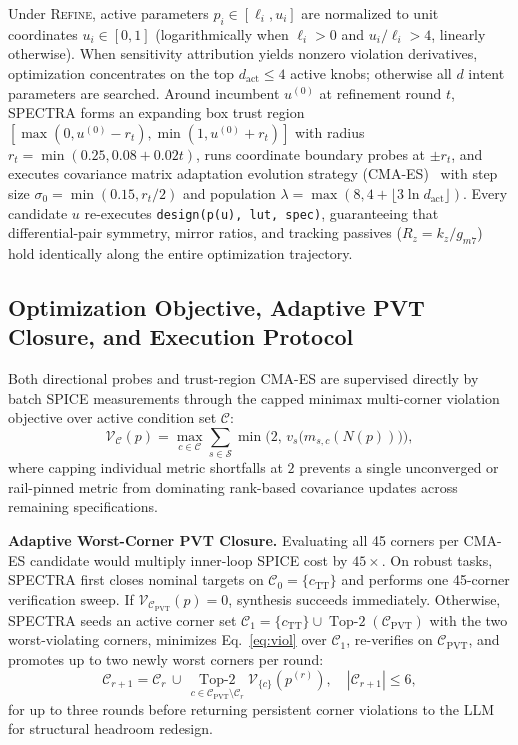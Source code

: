 Under \textsc{Refine}, active parameters $p_i \in [\ell_i, u_i]$ are normalized to unit coordinates $u_i \in [0, 1]$ (logarithmically when $\ell_i > 0$ and $u_i / \ell_i > 4$, linearly otherwise). When sensitivity attribution yields nonzero violation derivatives, optimization concentrates on the top $d_{\text{act}} \le 4$ active knobs; otherwise all $d$ intent parameters are searched. Around incumbent $u^{(0)}$ at refinement round $t$, \textsc{SPECTRA} forms an expanding box trust region $[\max(0, u^{(0)} - r_t), \min(1, u^{(0)} + r_t)]$ with radius $r_t = \min(0.25, 0.08 + 0.02 t)$, runs coordinate boundary probes at $\pm r_t$, and executes covariance matrix adaptation evolution strategy (CMA-ES)~\cite{hansen2016cma} with step size $\sigma_0 = \min(0.15, r_t/2)$ and population $\lambda = \max(8, 4 + \lfloor 3 \ln d_{\text{act}} \rfloor)$. Every candidate $u$ re-executes \texttt{design(p(u), lut, spec)}, guaranteeing that differential-pair symmetry, mirror ratios, and tracking passives ($R_z = k_z / g_{m7}$) hold identically along the entire optimization trajectory.

\subsection{Optimization Objective, Adaptive PVT Closure, and Execution Protocol}
\label{sec:opt}
Both directional probes and trust-region CMA-ES are supervised directly by batch SPICE measurements through the capped minimax multi-corner violation objective over active condition set $\mathcal{C}$:
\begin{equation}
  \mathcal{V}_{\mathcal{C}}(p) = \max_{c \in \mathcal{C}} \sum_{s \in \mathcal{S}} \min\!\Big(2,\, v_s\!\big(m_{s,c}(N(p))\big)\Big),
  \label{eq:viol}
\end{equation}
where capping individual metric shortfalls at $2$ prevents a single unconverged or rail-pinned metric from dominating rank-based covariance updates across remaining specifications.

\textbf{Adaptive Worst-Corner PVT Closure.} Evaluating all 45 corners per CMA-ES candidate would multiply inner-loop SPICE cost by $45\times$. On robust tasks, \textsc{SPECTRA} first closes nominal targets on $\mathcal{C}_0 = \{c_{\text{TT}}\}$ and performs one 45-corner verification sweep. If $\mathcal{V}_{\mathcal{C}_{\text{PVT}}}(p) = 0$, synthesis succeeds immediately. Otherwise, \textsc{SPECTRA} seeds an active corner set $\mathcal{C}_1 = \{c_{\text{TT}}\} \cup \operatorname{Top-2}(\mathcal{C}_{\text{PVT}})$ with the two worst-violating corners, minimizes Eq.~\eqref{eq:viol} over $\mathcal{C}_1$, re-verifies on $\mathcal{C}_{\text{PVT}}$, and promotes up to two newly worst corners per round:
\begin{equation}
  \mathcal{C}_{r+1} = \mathcal{C}_r \,\cup\, \operatorname*{Top-2}_{c \in \mathcal{C}_{\text{PVT}} \setminus \mathcal{C}_r} \mathcal{V}_{\{c\}}(p^{(r)}), \quad |\mathcal{C}_{r+1}| \le 6,
  \label{eq:active_set}
\end{equation}
for up to three rounds before returning persistent corner violations to the LLM for structural headroom redesign.

